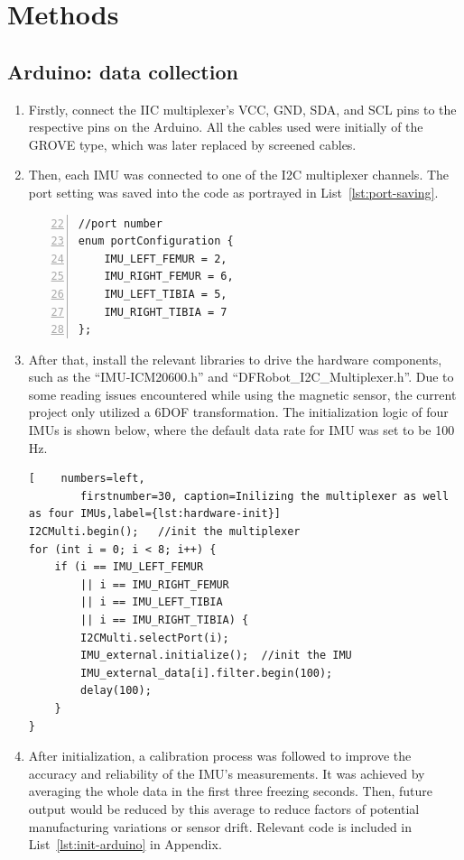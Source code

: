 \section{Methods}


\subsection{Arduino: data collection}\label{subsec:data-fetching}
\begin{enumerate}
	\item   Firstly, connect the IIC multiplexer's VCC, GND, SDA, and SCL pins to the respective pins on the Arduino.
	All the cables used were initially of the GROVE type, which was later replaced by screened cables.
	\item   Then, each IMU was connected to one of the I2C multiplexer channels.
	The port setting was saved into the code as portrayed in List~\ref{lst:port-saving}.

	\lstset{language=C++}
	\begin{lstlisting}[caption=Saving the port setting of four IMUs.,    numbers=left,
		firstnumber=22, label={lst:port-saving}]
//port number
enum portConfiguration {
    IMU_LEFT_FEMUR = 2,
    IMU_RIGHT_FEMUR = 6,
    IMU_LEFT_TIBIA = 5,
    IMU_RIGHT_TIBIA = 7
};
	\end{lstlisting}

	\item   After that, install the relevant libraries to drive the hardware components, such as the ``IMU-ICM20600.h'' and ``DFRobot\_I2C\_Multiplexer.h''.
	Due to some reading issues encountered while using the magnetic sensor, the current project only utilized a 6DOF transformation.
	The initialization logic of four IMUs is shown below, where the default data rate for IMU was set to be 100 Hz.

	\lstset{language=C++}
	\begin{lstlisting}[    numbers=left,
		firstnumber=30, caption=Inilizing the multiplexer as well as four IMUs,label={lst:hardware-init}]
I2CMulti.begin();   //init the multiplexer
for (int i = 0; i < 8; i++) {
    if (i == IMU_LEFT_FEMUR
        || i == IMU_RIGHT_FEMUR
        || i == IMU_LEFT_TIBIA
        || i == IMU_RIGHT_TIBIA) {
        I2CMulti.selectPort(i);
        IMU_external.initialize();  //init the IMU
        IMU_external_data[i].filter.begin(100);
        delay(100);
    }
}
	\end{lstlisting}

	\item   After initialization, a calibration process was followed to improve the accuracy and reliability of the IMU's measurements.
	It was achieved by averaging the whole data in the first three freezing seconds.
	Then, future output would be reduced by this average to reduce factors of potential manufacturing variations or sensor drift.
	Relevant code is included in List~\ref{lst:init-arduino} in Appendix.


\end{enumerate}

